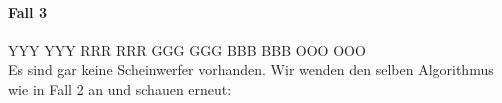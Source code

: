 \paragraph{Fall 3}
\RubikCubeGreyAll%
            {Y}{Y}{Y}
            {Y}{Y}{Y}%
               {R}{R}{R}
	       {R}{R}{R}%
	       {G}{G}{G}
	       {G}{G}{G}%
	      {B}{B}{B}
	      {B}{B}{B}%
	      {O}{O}{O}
	      {O}{O}{O}%
\\[1em]
Es sind gar keine Scheinwerfer vorhanden. Wir wenden den selben Algorithmus
wie in Fall 2 an und schauen erneut:
\begin{center}
\end{center}
